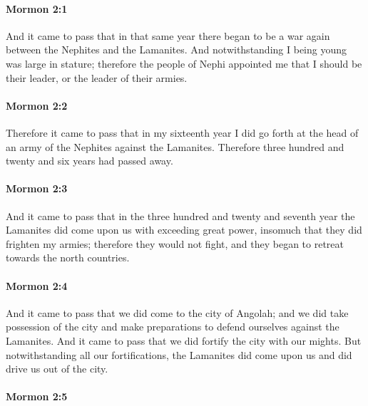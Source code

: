 		\paragraph{Mormon 2:1} %
			\label{MORMON-2-1}

			And it came to pass that in that same year
			there began to be a war again between the Nephites and the Lamanites.
			And notwithstanding I being young was large in stature;
			therefore the people of Nephi appointed me
			that I should be their leader, or the leader of their armies.

		\paragraph{Mormon 2:2} %
			\label{MORMON-2-2}

			Therefore it came to pass that in my sixteenth year
			I did go forth at the head of an army of the Nephites against the Lamanites.
			Therefore three hundred and twenty and six years had passed away.

		\paragraph{Mormon 2:3} %
			\label{MORMON-2-3}

			And it came to pass that in the three hundred and twenty and seventh year
			the Lamanites did come upon us with exceeding great power,
			insomuch that they did frighten my armies;
			therefore they would not fight,
			and they began to retreat towards the north countries.

		\paragraph{Mormon 2:4} %
			\label{MORMON-2-4}

			And it came to pass that we did come to the city of Angolah;
			and we did take possession of the city
			and make preparations to defend ourselves against the Lamanites.
			And it came to pass that we did fortify the city with our mights.
			But notwithstanding all our fortifications, the Lamanites did come upon us
			and did drive us out of the city.

		\paragraph{Mormon 2:5} %
			\label{MORMON-2-5}

